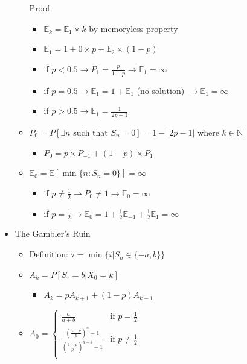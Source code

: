 \documentclass[a4paper]{article}
\begin{document}
\begin{itemize}
\begin{itemize}
                Proof
                \begin{itemize}
                    \item $\mathbb{E}_k = \mathbb{E}_1 \times k$ by memoryless property
                    \item $\mathbb{E}_1 = 1 + 0 \times p + \mathbb{E}_2 \times (1-p)$
                    \item if $p < 0.5 \rightarrow P_1 = \frac{p}{1-p} \rightarrow \mathbb{E}_1 = \infty$
                    \item if $p = 0.5 \rightarrow \mathbb{E}_1 = 1 + \mathbb{E}_1$ (no solution) $\rightarrow \mathbb{E}_1 = \infty$
                    \item if $p > 0.5 \rightarrow \mathbb{E}_1 = \frac{1}{2p-1}$
                \end{itemize}
            \item $P_0 = P[ \exists n \text{ such that } S_n = 0] = 1 - |2p-1|$ where $k \in \mathbb{N}$
                \begin{itemize}
                    \item $P_0 = p \times P_{-1} + (1-p) \times P_1$
                \end{itemize}
            \item $\mathbb{E}_0 = \mathbb{E}[\min\{n:S_n =0\}] = \infty$
                \begin{itemize}
                    \item if $p \not = \frac{1}{2} \rightarrow P_0 \not = 1 \rightarrow \mathbb{E}_0 = \infty$
                    \item if $p = \frac{1}{2} \rightarrow \mathbb{E}_0 = 1 + \frac{1}{2} \mathbb{E}_{-1} + \frac{1}{2} \mathbb{E}_1 = \infty$
                \end{itemize}
        \end{itemize}
    \item The Gambler's Ruin
        \begin{itemize}
            \item Definition: $\tau = \min\{i| S_n \in \{-a, b\}\}$
            \item $A_k = P[S_\tau = b | X_0 = k]$
                \begin{itemize}
                    \item $A_k = p A_{k+1} + (1-p) A_{k-1}$
                \end{itemize}
            \item $A_0 = \left\{ \begin{array}{cc}
                        \frac{a}{a+b} & \text{if } p = \frac{1}{2} \\
                        \frac{(\frac{1-p}{p})^a - 1}{(\frac{1-p}{p})^{a+b} - 1} & \text{if } p \not = \frac{1}{2} \\
                \end{array} \right.$


\end{itemize}
\end{itemize}
\end{document}
